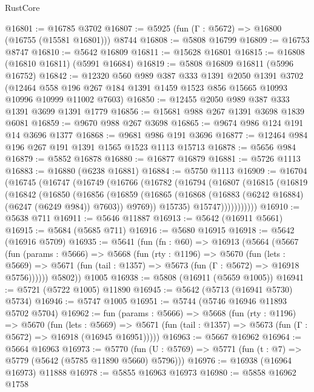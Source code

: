 \begin{lexlean}{RustCore}
\begin{coremodule}
@16801 := @16785 @3702
@16807 := @5925 (fun (Γ : @5672) => @16800 (@16755 (@15581 @16801))) @8744
@16808 := @5808 @16799
@16809 := @16753 @8747
@16810 := @5642 @16809
@16811 := @15628 @16801
@16815 := @16808 (@16810 @16811) (@5991 @16684)
@16819 := @5808 @16809 @16811 (@5996 @16752)
@16842 := @12320
    @560
    @989
    @387
    @333
    @1391
    @2050
    @1391
    @3702
    (@12464 @558 @196 @267 @184 @1391 @1459 @1523 @856 @15665 @10993 @10996 @10999 @11002 @7603)
@16850 := @12455 @2050 @989 @387 @333 @1391 @3699 @1391 @1779
@16856 := @15681 @988 @267 @1391 @3698 @1839 @6081
@16859 := @9670 @988 @267 @3698
@16865 := @9674 @986 @124 @191 @14 @3696 @1377
@16868 := @9681 @986 @191 @3696
@16877 := @12464 @984 @196 @267 @191 @1391 @1565 @1523 @1113 @15713
@16878 := @5656 @984
@16879 := @5852 @16878
@16880 := @16877 @16879
@16881 := @5726 @1113
@16883 := @16880 (@6238 @16881)
@16884 := @5750 @1113
@16909 := @16704
    (@16745
      (@16747
        (@16749
          (@16766
            (@16782
              (@16794
                (@16807
                  (@16815
                    (@16819
                      (@16842
                        (@16850
                          (@16856
                            (@16859
                              (@16865
                                (@16868 (@16883 (@6242 @16884) (@6247 (@6249 @984)) @7603))
                                @9769))
                            @15735)
                          @15747)))))))))))
@16910 := @5638 @711
@16911 := @5646 @11887
@16913 := @5642 (@16911 @5661)
@16915 := @5684 (@5685 @711)
@16916 := @5680 @16915
@16918 := @5642 (@16916 @5709)
@16935 := @5641
    (fun (fn : @60) =>
    @16913
      (@5664
        (@5667
          (fun (params : @5666) =>
          @5668
            (fun (rty : @1196) =>
            @5670
              (fun (lets : @5669) =>
              @5671 (fun (tail : @1357) => @5673 (fun (Γ : @5672) => @16918 @5756))))))
        @5802))
    @1005
@16938 := @5808 (@16911 (@5659 @1005))
@16941 := @5721 (@5722 @1005) @11890
@16945 := @5642 (@5713 (@16941 @5730) @5734)
@16946 := @5747 @1005
@16951 := @5744 (@5746 @16946 @11893 @5702 @5704)
@16962 := fun (params : @5666) =>
  @5668
    (fun (rty : @1196) =>
    @5670
      (fun (lets : @5669) =>
      @5671 (fun (tail : @1357) => @5673 (fun (Γ : @5672) => @16918 (@16945 @16951)))))
@16963 := @5667 @16962
@16964 := @5664 @16963
@16973 := @5770
    (fun (U : @5769) => @5771 (fun (t : @7) => @5779 (@5642 (@5785 @11890 @5660) @5796)))
@16976 := @16938 (@16964 @16973) @11888
@16978 := @5855 @16963 @16973
@16980 := @5858 @16962 @1758

\end{coremodule}
\end{lexlean}
